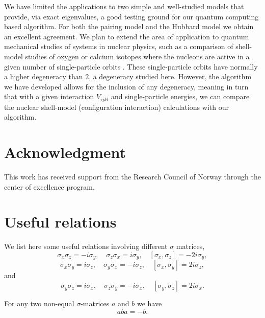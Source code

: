 \documentclass[aps,pra,twocolumn,floatfix]{revtex4}
\begin{document}
We have limited the applications to two simple and well-studied models that provide,
via exact eigenvalues, a good testing ground for our quantum computing based 
algorithm.  For both the pairing model and the Hubbard model we obtain an excellent agreement.
We plan to extend the area of application to quantum mechanical studies  of systems in nuclear physics,
such as a comparison of shell-model studies of oxygen or calcium isotopes where the nucleons are active 
in a given number of single-particle orbits \cite{mhj95,caurier2005}. These single-particle orbits have normally a higher 
degeneracy than $2$, a degeneracy  studied here.  However, the algorithm we have developed allows
for the inclusion of any  degeneracy, meaning in turn that with a given interaction $V_{ijkl}$   
and single-particle energies, we can compare the nuclear shell-model (configuration interaction) calculations
with our algorithm. 



\section*{Acknowledgment}
This work has received support from the Research Council of Norway through the center of
excellence program. 


\appendix*

\section{Useful relations}

We list here some useful relations involving different $\sigma$ matrices,
\begin{equation}
\sigma_x \sigma_z = -i\sigma_y, \quad
\sigma_z \sigma_x = i\sigma_y, \quad [\sigma_x, \sigma_z]=-2i\sigma_y,
\end{equation}
\begin{equation}
\sigma_x \sigma_y = i\sigma_z, \quad
\sigma_y \sigma_x = -i\sigma_z, \quad [\sigma_x, \sigma_y]=2i\sigma_z,
\end{equation}
and
\begin{equation}
\sigma_y \sigma_z = i\sigma_x, \quad
\sigma_z \sigma_y = -i\sigma_x, \quad [\sigma_y, \sigma_z]=2i\sigma_x.
\end{equation}


For any two non-equal $\sigma$-matrices $a$ and $b$ we have 
\begin{equation}
aba = -b.
\end{equation}
\end{document}
